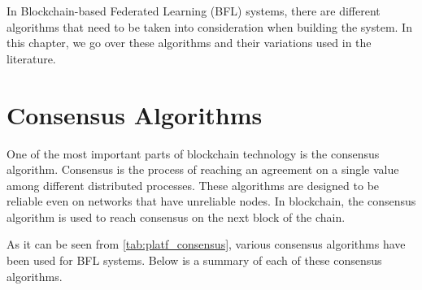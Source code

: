 In Blockchain-based Federated Learning (BFL) systems, there are different algorithms that need to be taken into consideration when building the system. In this chapter, we go over these algorithms and their variations used in the literature.

\section{Consensus Algorithms}\label{related_work:consensus_algorithms}

One of the most important parts of blockchain technology is the consensus algorithm. Consensus is the process of reaching an agreement on a single value among different distributed processes. These algorithms are designed to be reliable even on networks that have unreliable nodes. In blockchain, the consensus algorithm is used to reach consensus on the next block of the chain.

As it can be seen from \autoref{tab:platf_consensus}, various consensus algorithms have been used for BFL systems. Below is a summary of each of these consensus algorithms.

